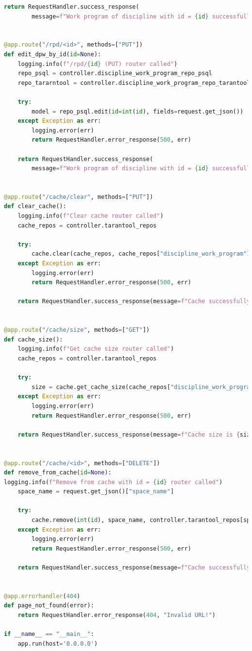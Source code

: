 \begin{lstlisting}[label=lst:app, caption=Листинг взаимодействия клиента с сервером, language=python]
	return RequestHandler.success_response(
		message=f"Work program of discipline with id = {id} successfully deleted")


@app.route("/rpd/<id>", methods=["PUT"])
def edit_dpw_by_id(id=None):
	logging.info(f"/rpd/{id} (PUT) router called")
	repo_psql = controller.discipline_work_program_repo_psql
	repo_tararntool = controller.discipline_work_program_repo_tarantool

	try:
		model = repo_psql.edit(id=int(id), fields=request.get_json())
	except Exception as err:
		logging.error(err)
		return RequestHandler.error_response(500, err)

	return RequestHandler.success_response(
		message=f"Work program of discipline with id = {id} successfully changed")


@app.route("/cache/clear", methods=["PUT"])
def clear_cache():
	logging.info(f"Clear cache router called")
	cache_repos = controller.tarantool_repos

	try:
		cache.clear(cache_repos, cache_repos["discipline_work_program"].connection)
	except Exception as err:
		logging.error(err)
		return RequestHandler.error_response(500, err)

	return RequestHandler.success_response(message=f"Cache successfully cleared")


@app.route("/cache/size", methods=["GET"])
def cache_size():
	logging.info(f"Get cache size router called")
	cache_repos = controller.tarantool_repos

	try:
		size = cache.get_cache_size(cache_repos["discipline_work_program"].connection)
	except Exception as err:
		logging.error(err)
		return RequestHandler.error_response(500, err)

	return RequestHandler.success_response(message=f"Cache size is {size}")


@app.route("/cache/<id>", methods=["DELETE"])
def remove_from_cache(id=None):
logging.info(f"Remove from cache with id = {id} router called")
	space_name = request.get_json()["space_name"]

	try:
		cache.remove(int(id), space_name, controller.tarantool_repos[space_name])
	except Exception as err:
		logging.error(err)
		return RequestHandler.error_response(500, err)

	return RequestHandler.success_response(message=f"Cache successfully cleared")


@app.errorhandler(404)
def page_not_found(error):
	return RequestHandler.error_response(404, "Invalid URL!")

if __name__ == "__main__":
	app.run(host='0.0.0.0')
\end{lstlisting}

